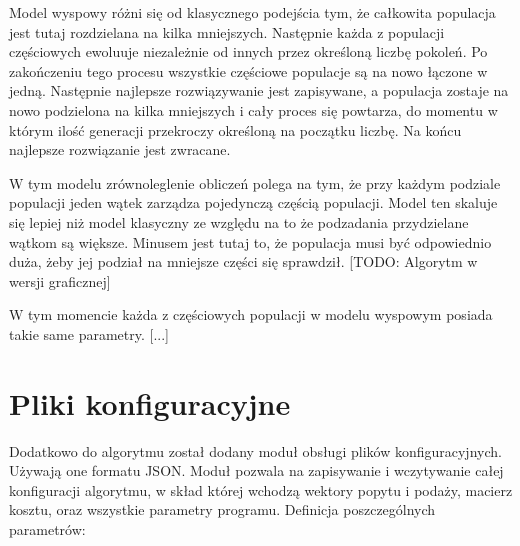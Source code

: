 Model wyspowy różni się od klasycznego podejścia tym, że całkowita populacja jest tutaj rozdzielana na kilka mniejszych. Następnie każda z 
populacji częściowych ewoluuje niezależnie od innych przez określoną liczbę pokoleń. Po zakończeniu tego procesu wszystkie częściowe populacje 
są na nowo łączone w jedną. Następnie najlepsze rozwiązywanie jest zapisywane, a populacja zostaje na nowo podzielona na kilka mniejszych i 
cały proces się powtarza, do momentu w którym ilość generacji przekroczy określoną na początku liczbę. Na końcu najlepsze rozwiązanie jest zwracane.

W tym modelu zrównoleglenie obliczeń polega na tym, że przy każdym podziale populacji jeden wątek zarządza pojedynczą częścią populacji.
Model ten skaluje się lepiej niż model klasyczny ze względu na to że podzadania przydzielane wątkom są większe. Minusem jest tutaj to, że populacja 
musi być odpowiednio duża, żeby jej podział na mniejsze części się sprawdził.
[TODO: Algorytm w wersji graficznej]

W tym momencie każda z częściowych populacji w modelu wyspowym posiada takie same parametry. [...]

\section{Pliki konfiguracyjne}
Dodatkowo do algorytmu został dodany moduł obsługi plików konfiguracyjnych. Używają one formatu JSON. Moduł pozwala na zapisywanie i wczytywanie 
całej konfiguracji algorytmu, w skład której wchodzą wektory popytu i podaży, macierz kosztu, oraz wszystkie parametry programu.
Definicja poszczególnych parametrów:

